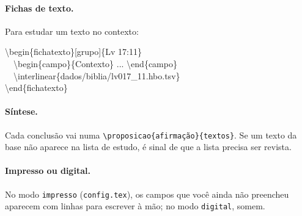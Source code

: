 \paragraph{Fichas de texto.} Para estudar um texto no contexto:

\begin{nota}[Exemplo]
\small\ttfamily
\textbackslash begin\{fichatexto\}[grupo]\{Lv 17:11\}\\
\ \ \textbackslash begin\{campo\}\{Contexto\} ... \textbackslash end\{campo\}\\
\ \ \textbackslash interlinear\{dados/biblia/lv017\_11.hbo.tsv\}\\
\textbackslash end\{fichatexto\}
\end{nota}

\paragraph{Síntese.} Cada conclusão vai numa \verb|\proposicao{afirmação}{textos}|.
Se um texto da base não aparece na lista de estudo, é sinal de que a lista
precisa ser revista.

\paragraph{Impresso ou digital.} No modo \texttt{impresso}
(\texttt{config.tex}), os campos que você ainda não preencheu aparecem com
linhas para escrever à mão; no modo \texttt{digital}, somem.
